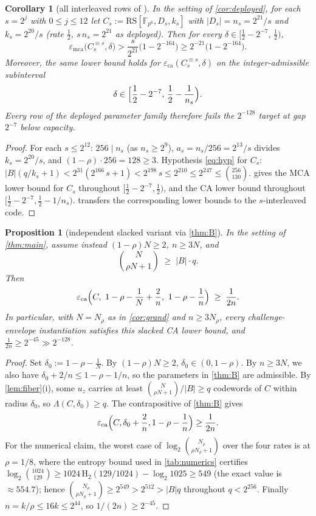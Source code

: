 \documentclass[11pt]{article}
\newtheorem{proposition}[theorem]{Proposition}
\newtheorem{corollary}[theorem]{Corollary}
\theoremstyle{definition}
\theoremstyle{remark}
\newcommand{\F}{\mathbb{F}}
\newcommand{\B}{B}
\newcommand{\RS}{\mathrm{RS}}
\newcommand{\eca}{\varepsilon_{\mathrm{ca}}}
\newcommand{\emca}{\varepsilon_{\mathrm{mca}}}
\newcommand{\Lst}{\Lambda}
\newcommand{\Hb}{\mathrm{H}_2}
\begin{document}
\begin{corollary}[all interleaved rows of {\cite[Tables 2--3]{ABF26}}]\label{cor:rows}
In the setting of \cref{cor:deployed}, for each $s=2^j$ with $0\le j\le12$ let $C_s:=\RS[\F_{p^6},D_s,k_s]$ with $|D_s|=n_s=2^{21}/s$ and $k_s=2^{20}/s$ (rate $\frac12$, $s\,n_s=2^{21}$ as deployed). Then for every $\delta\in\bigl[\frac12-2^{-7},\,\frac12\bigr)$,
\[
\emca\bigl(C_s^{\equiv s},\delta\bigr)
>
\frac s{2^{21}}\bigl(1-2^{-164}\bigr)
\ge
2^{-21}\bigl(1-2^{-164}\bigr).
\]
Moreover, the same lower bound holds for $\eca(C_s^{\equiv s},\delta)$ on the integer-admissible subinterval
\[
        \delta\in
        \Bigl[\frac12-2^{-7},\,\frac12-\frac1{n_s}\Bigr).
\]
Every row of the deployed parameter family therefore fails the $2^{-128}$ target at gap $2^{-7}$ below capacity.
\end{corollary}

\begin{proof}
For each $s\le2^{12}$: $256\mid n_s$ (as $n_s\ge2^9$), $a_s=n_s/256=2^{13}/s$ divides $k_s=2^{20}/s$, and $(1-\rho)\cdot256=128\ge3$. Hypothesis \eqref{eq:hyp} for $C_s$: $|\B|(q/k_s+1)<2^{31}(2^{166}\,s+1)<2^{198}\,s\le2^{210}\le2^{247}\le\binom{256}{130}$.  gives the MCA lower bound for $C_s$ throughout $[\frac12-2^{-7},\frac12)$, and the CA lower bound throughout $[\frac12-2^{-7},\frac12-1/n_s)$.  transfers the corresponding lower bounds to the $s$-interleaved code.
\end{proof}

\begin{proposition}[independent slacked variant via \cref{thm:B}]\label{prop:slacked}
In the setting of \cref{thm:main}, assume instead $(1-\rho)N\ge2$, $n\ge3N$, and
\[
\binom{N}{\rho N+1}\;\ge\;|\B|\cdot q .
\]
Then
\[
\eca\Bigl(C,\ 1-\rho-\frac1N+\frac2n,\ 1-\rho-\frac1n\Bigr)\;\ge\;\frac1{2n}.
\]
In particular, with $N=N_\rho$ as in \cref{cor:grand} and $n\ge3N_\rho$, every challenge-envelope instantiation satisfies this slacked CA lower bound, and $\frac1{2n}\ge2^{-45}\gg2^{-128}$.
\end{proposition}

\begin{proof}
Set $\delta_0:=1-\rho-\frac1N$. By $(1-\rho)N\ge2$, $\delta_0\in(0,1-\rho)$. By $n\ge3N$, we also have $\delta_0+2/n\le1-\rho-1/n$, so the parameters in \cref{thm:B} are admissible. By \cref{lem:fiber}(i), some $u_z$ carries at least $\binom N{\rho N+1}/|\B|\ge q$ codewords of $C$ within radius $\delta_0$, so $\Lst(C,\delta_0)\ge q$. The contrapositive of \cref{thm:B} gives
\[
\eca\Bigl(C,\delta_0+\frac2n,1-\rho-\frac1n\Bigr)\ge\frac1{2n}.
\]
For the numerical claim, the worst case of $\log_2\binom{N_\rho}{\rho N_\rho+1}$ over the four rates is at $\rho=1/8$, where the entropy bound used in \cref{tab:numerics} certifies $\log_2\binom{1024}{129}\ge1024\,\Hb(129/1024)-\log_2 1025\ge549$ (the exact value is $\approx554.7$); hence $\binom{N_\rho}{\rho N_\rho+1}\ge2^{549}>2^{512}>|\B|q$ throughout $q<2^{256}$. Finally $n=k/\rho\le16k\le2^{44}$, so $1/(2n)\ge2^{-45}$.
\end{proof}
\end{document}
